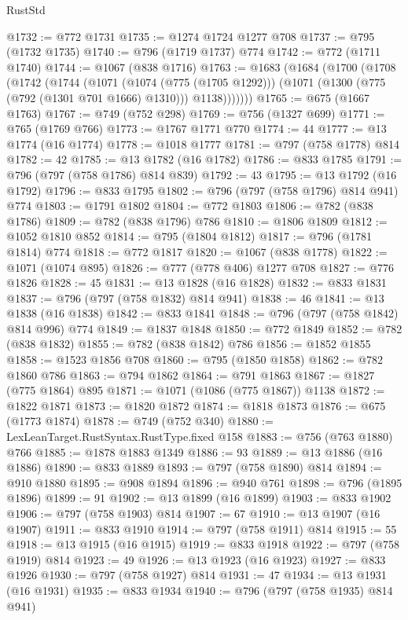\begin{lexlean}{RustStd}
\begin{coremodule}
@1732 := @772 @1731
@1735 := @1274 @1724 @1277 @708
@1737 := @795 (@1732 @1735)
@1740 := @796 (@1719 @1737) @774
@1742 := @772 (@1711 @1740)
@1744 := @1067 (@838 @1716)
@1763 := @1683
    (@1684
      (@1700
        (@1708
          (@1742
            (@1744
              (@1071
                (@1074 (@775 (@1705 @1292)))
                (@1071 (@1300 (@775 (@792 (@1301 @701 @1666) @1310))) @1138)))))))
@1765 := @675 (@1667 @1763)
@1767 := @749 (@752 @298)
@1769 := @756 (@1327 @699)
@1771 := @765 (@1769 @766)
@1773 := @1767 @1771 @770
@1774 := 44
@1777 := @13 @1774 (@16 @1774)
@1778 := @1018 @1777
@1781 := @797 (@758 @1778) @814
@1782 := 42
@1785 := @13 @1782 (@16 @1782)
@1786 := @833 @1785
@1791 := @796 (@797 (@758 @1786) @814 @839)
@1792 := 43
@1795 := @13 @1792 (@16 @1792)
@1796 := @833 @1795
@1802 := @796 (@797 (@758 @1796) @814 @941) @774
@1803 := @1791 @1802
@1804 := @772 @1803
@1806 := @782 (@838 @1786)
@1809 := @782 (@838 @1796) @786
@1810 := @1806 @1809
@1812 := @1052 @1810 @852
@1814 := @795 (@1804 @1812)
@1817 := @796 (@1781 @1814) @774
@1818 := @772 @1817
@1820 := @1067 (@838 @1778)
@1822 := @1071 (@1074 @895)
@1826 := @777 (@778 @406) @1277 @708
@1827 := @776 @1826
@1828 := 45
@1831 := @13 @1828 (@16 @1828)
@1832 := @833 @1831
@1837 := @796 (@797 (@758 @1832) @814 @941)
@1838 := 46
@1841 := @13 @1838 (@16 @1838)
@1842 := @833 @1841
@1848 := @796 (@797 (@758 @1842) @814 @996) @774
@1849 := @1837 @1848
@1850 := @772 @1849
@1852 := @782 (@838 @1832)
@1855 := @782 (@838 @1842) @786
@1856 := @1852 @1855
@1858 := @1523 @1856 @708
@1860 := @795 (@1850 @1858)
@1862 := @782 @1860 @786
@1863 := @794 @1862
@1864 := @791 @1863
@1867 := @1827 (@775 @1864) @895
@1871 := @1071 (@1086 (@775 @1867)) @1138
@1872 := @1822 @1871
@1873 := @1820 @1872
@1874 := @1818 @1873
@1876 := @675 (@1773 @1874)
@1878 := @749 (@752 @340)
@1880 := LexLeanTarget.RustSyntax.RustType.fixed @158
@1883 := @756 (@763 @1880) @766
@1885 := @1878 @1883 @1349
@1886 := 93
@1889 := @13 @1886 (@16 @1886)
@1890 := @833 @1889
@1893 := @797 (@758 @1890) @814
@1894 := @910 @1880
@1895 := @908 @1894
@1896 := @940 @761
@1898 := @796 (@1895 @1896)
@1899 := 91
@1902 := @13 @1899 (@16 @1899)
@1903 := @833 @1902
@1906 := @797 (@758 @1903) @814
@1907 := 67
@1910 := @13 @1907 (@16 @1907)
@1911 := @833 @1910
@1914 := @797 (@758 @1911) @814
@1915 := 55
@1918 := @13 @1915 (@16 @1915)
@1919 := @833 @1918
@1922 := @797 (@758 @1919) @814
@1923 := 49
@1926 := @13 @1923 (@16 @1923)
@1927 := @833 @1926
@1930 := @797 (@758 @1927) @814
@1931 := 47
@1934 := @13 @1931 (@16 @1931)
@1935 := @833 @1934
@1940 := @796 (@797 (@758 @1935) @814 @941)

\end{coremodule}
\end{lexlean}
